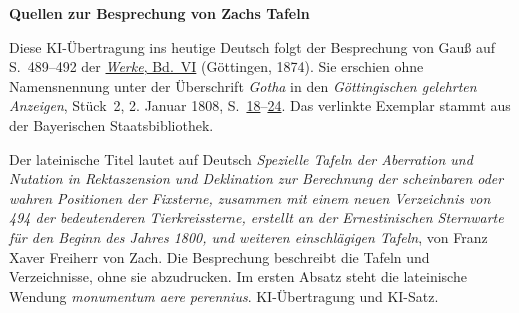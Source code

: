 \clearpage\thispagestyle{empty}
\begin{center}\textbf{Quellen zur Besprechung von Zachs Tafeln}\end{center}
\noindent Diese KI-Übertragung ins heutige Deutsch folgt der Besprechung von Gauß auf S.~489--492 der \href{https://gdz.sub.uni-goettingen.de/id/PPN236007467}{\textit{Werke}, Bd.~VI} (Göttingen, 1874). Sie erschien ohne Namensnennung unter der Überschrift \emph{Gotha} in den \textit{Göttingischen gelehrten Anzeigen}, Stück~2, 2. Januar 1808, S.~\href{https://api.digitale-sammlungen.de/iiif/image/v2/bsb10538673_00024/full/1800,/0/default.jpg}{18}--\href{https://api.digitale-sammlungen.de/iiif/image/v2/bsb10538673_00030/full/1800,/0/default.jpg}{24}. Das verlinkte Exemplar stammt aus der Bayerischen Staatsbibliothek.
\par\smallskip\noindent Der lateinische Titel lautet auf Deutsch \emph{Spezielle Tafeln der Aberration und Nutation in Rektaszension und Deklination zur Berechnung der scheinbaren oder wahren Positionen der Fixsterne, zusammen mit einem neuen Verzeichnis von 494 der bedeutenderen Tierkreissterne, erstellt an der Ernestinischen Sternwarte für den Beginn des Jahres 1800, und weiteren einschlägigen Tafeln}, von Franz Xaver Freiherr von Zach. Die Besprechung beschreibt die Tafeln und Verzeichnisse, ohne sie abzudrucken. Im ersten Absatz steht die lateinische Wendung \emph{monumentum aere perennius}. KI-Übertragung und KI-Satz.
\clearpage
